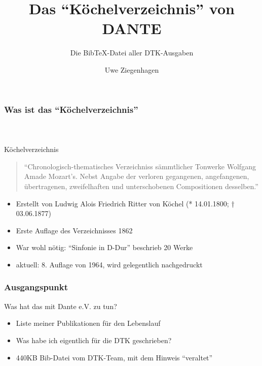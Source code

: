 \documentclass[ngerman]{beamer}
\author{Uwe Ziegenhagen}
\title{Das \enquote{Köchelverzeichnis} von DANTE}
\subtitle{Die Bib\TeX-Datei aller DTK-Ausgaben}
\begin{document}
\begin{frame}

\maketitle

\end{frame}

\begin{frame}
\frametitle{Was ist das \enquote{Köchelverzeichnis}}
\framesubtitle{~}

Köchelverzeichnis

\begin{quote}
\enquote{Chronologisch-thematisches Verzeichniss sämmtlicher Tonwerke Wolfgang Amade Mozart’s. Nebst Angabe der verloren gegangenen, angefangenen, übertragenen, zweifelhaften und unterschobenen Compositionen desselben.}
\end{quote}

\begin{itemize}
	\item Erstellt von Ludwig Alois Friedrich Ritter von Köchel \newline (* 14.01.1800; † 03.06.1877)
	\item Erste Auflage des Verzeichnisses 1862
	\item War wohl nötig: \enquote{Sinfonie in D-Dur} beschrieb 20 Werke
	\item aktuell: 8. Auflage von 1964, wird gelegentlich nachgedruckt
	\end{itemize}


\end{frame}


\begin{frame}
\frametitle{Ausgangspunkt}

Was hat das mit Dante e.V. zu tun?

\begin{itemize}
\item Liste meiner Publikationen für den Lebenslauf
\item Was habe ich eigentlich für die DTK geschrieben?
\item 440KB Bib-Datei vom DTK-Team, mit dem Hinweis \enquote{veraltet}
\end{itemize}
\end{frame}
\end{document}

